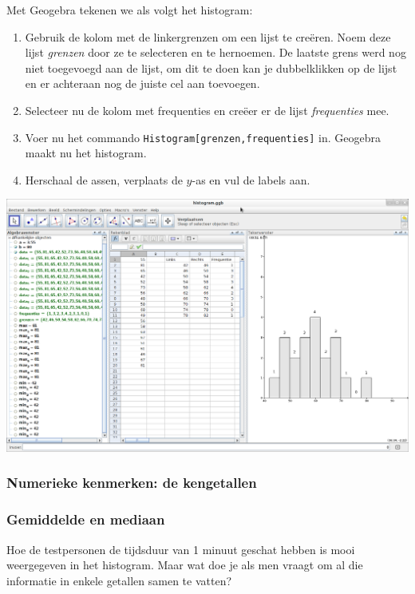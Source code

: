 \documentclass[12pt,twoside]{article}
\begin{document}
Met Geogebra tekenen we als volgt het histogram:
\begin{enumerate}
  \item Gebruik de kolom met de linkergrenzen om een lijst te creëren. Noem deze lijst {\it grenzen} door ze te selecteren en te hernoemen. De laatste grens werd nog niet toegevoegd aan de lijst, om dit te doen kan je dubbelklikken op de lijst en er achteraan nog de juiste cel aan toevoegen.
  \item Selecteer nu de kolom met frequenties en creëer er de lijst {\it frequenties} mee.
  \item Voer nu het commando \verb#Histogram[grenzen,frequenties]# in. Geogebra maakt nu het histogram.
  \item Herschaal de assen, verplaats de $y$-as en vul de labels aan.
\end{enumerate}

\begin{center}
  \includegraphics[width=14cm]{gg-histogram}
\end{center}

\subsubsection{Numerieke kenmerken: de kengetallen}

\subsubsection*{Gemiddelde en mediaan}

Hoe de testpersonen de tijdsduur van 1 minuut geschat hebben is mooi weergegeven
in het histogram. Maar wat doe je als men vraagt om al die informatie in enkele
getallen samen te vatten?
\end{document}
